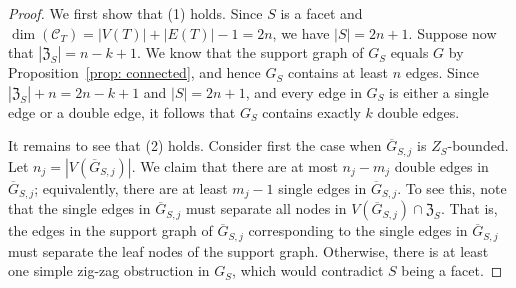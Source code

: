 \documentclass[11pt]{article}
\theoremstyle{definition}
\numberwithin{equation}{section}
\begin{document}
\begin{proof} 
	





We first show that (1) holds.  
Since $S$ is a facet and $\dim(\mathcal{C}_T) = |V(T)| + |E(T)| - 1 = 2n$, we have  $|S| = 2n+1$. 
Suppose now that $|\mathfrak{Z}_S| = n-k+1$.  
We know that the support graph of  $G_S$ equals $G$ by Proposition~\ref{prop: connected}, and hence $G_S$ contains at least $n$ edges.  
Since $|\mathfrak{Z}_S| + n = 2n-k +1$ and $|S| = 2n+1$, and every edge in $G_S$ is either a single edge or a double edge, it follows that $G_S$ contains exactly $k$ double edges. 

It remains to see that (2) holds. 
Consider first the case when $\overline{G}_{S,j}$ is $Z_S$-bounded.  
Let $n_j = |V(\overline{G}_{S,j})|$. 
We claim that there are at most $n_j - m_j$ double edges in $\overline{G}_{S,j}$; equivalently,  there are at least $m_j - 1$ single edges in $\overline{G}_{S,j}$.  
To see this, note that the single edges in $\overline{G}_{S,j}$ must separate all nodes in $V(\overline{G}_{S,j})\cap\mathfrak{Z}_S$.  
That is, the edges in the support graph of $\overline{G}_{S,j}$ corresponding to the single edges in $\overline{G}_{S,j}$ must separate the leaf nodes of the support graph. 
Otherwise, there is at least one simple zig-zag obstruction in $G_S$, which would contradict $S$ being a facet. 


\end{proof}
\end{document}
